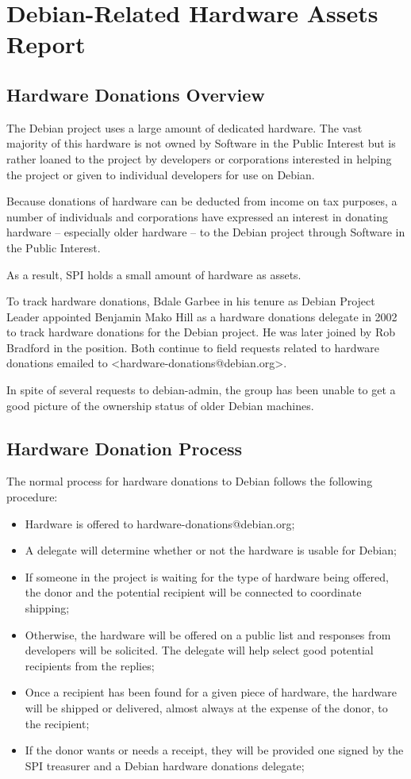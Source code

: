 \documentclass[letterpaper]{report}
\begin{document}
\section{Debian-Related Hardware Assets Report}


\subsection{Hardware Donations Overview}

The Debian project uses a large amount of dedicated hardware. The
vast majority of this hardware is not owned by Software in the Public
Interest but is rather loaned to the project by developers or corporations
interested in helping the project or given to individual developers
for use on Debian.

Because donations of hardware can be deducted from income on tax purposes,
a number of individuals and corporations have expressed an interest
in donating hardware -- especially older hardware -- to the Debian
project through Software in the Public Interest.

As a result, SPI holds a small amount of hardware as assets.

To track hardware donations, Bdale Garbee in his tenure as Debian
Project Leader appointed Benjamin Mako Hill as a hardware donations
delegate in 2002 to track hardware donations for the Debian project.
He was later joined by Rob Bradford in the position. Both continue
to field requests related to hardware donations emailed to <hardware-donations@debian.org>.

In spite of several requests to debian-admin, the group has been unable
to get a good picture of the ownership status of older Debian machines.


\subsection{Hardware Donation Process}

The normal process for hardware donations to Debian follows the following
procedure:

\begin{itemize}
\item Hardware is offered to hardware-donations@debian.org;
\item A delegate will determine whether or not the hardware is usable for
Debian;
\item If someone in the project is waiting for the type of hardware being
offered, the donor and the potential recipient will be connected to
coordinate shipping;
\item Otherwise, the hardware will be offered on a public list and responses
from developers will be solicited. The delegate will help select good
potential recipients from the replies;
\item Once a recipient has been found for a given piece of hardware, the
hardware will be shipped or delivered, almost always at the expense
of the donor, to the recipient;
\item If the donor wants or needs a receipt, they will be provided one signed
by the SPI treasurer and a Debian hardware donations delegate;
\end{itemize}
\end{document}

